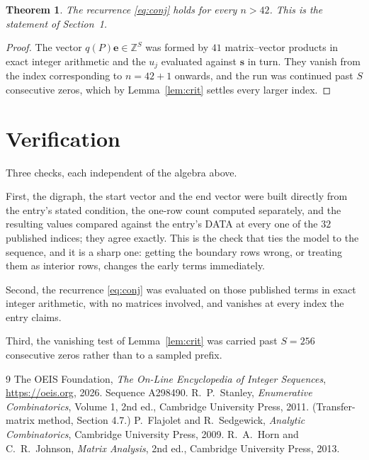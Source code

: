 \documentclass[11pt,a4paper]{article}
\theoremstyle{plain}
\newtheorem{theorem}{Theorem}
\theoremstyle{definition}
\begin{document}
\begin{theorem}
The recurrence \eqref{eq:conj} holds for every $n>42$. This is the statement of
Section~1.
\end{theorem}

\begin{proof}
The vector $q(P)\mathbf{e}\in\mathbb{Z}^{S}$ was formed by $41$ matrix--vector
products in exact integer arithmetic and the $u_j$ evaluated against $\mathbf{s}$ in turn.
They vanish from the index corresponding to $n=42+1$ onwards, and the run was continued
past $S$ consecutive zeros, which by Lemma~\ref{lem:crit} settles every larger index.
\end{proof}

\section{Verification}

Three checks, each independent of the algebra above.

First, the digraph, the start vector and the end vector were built directly from the
entry's stated condition, the one-row count computed separately, and the resulting values
compared against the entry's DATA at every one of the $32$ published indices; they
agree exactly. This is the check that ties the model to the sequence, and it is a sharp one:
getting the boundary rows wrong, or treating them as interior rows, changes the early terms
immediately.

Second, the recurrence \eqref{eq:conj} was evaluated on those published terms in exact
integer arithmetic, with no matrices involved, and vanishes at every index the entry claims.

Third, the vanishing test of Lemma~\ref{lem:crit} was carried past $S=256$ consecutive
zeros rather than to a sampled prefix.

\begin{thebibliography}{9}
 The OEIS Foundation, \emph{The On-Line Encyclopedia of Integer
Sequences}, \url{https://oeis.org}, 2026. Sequence A298490.
 R.~P.~Stanley, \emph{Enumerative Combinatorics}, Volume 1, 2nd ed.,
Cambridge University Press, 2011. (Transfer-matrix method, Section 4.7.)
 P.~Flajolet and R.~Sedgewick, \emph{Analytic Combinatorics}, Cambridge
University Press, 2009.
 R.~A.~Horn and C.~R.~Johnson, \emph{Matrix Analysis}, 2nd ed., Cambridge
University Press, 2013.
\end{thebibliography}
\end{document}
